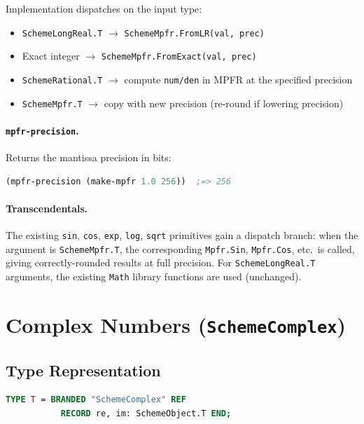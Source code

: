 \documentclass[12pt]{article}
\begin{document}
\noindent Implementation dispatches on the input type:
\begin{itemize}[nosep]
\item {\tt SchemeLongReal.T} $\to$ {\tt SchemeMpfr.FromLR(val, prec)}
\item Exact integer $\to$ {\tt SchemeMpfr.FromExact(val, prec)}
\item {\tt SchemeRational.T} $\to$ compute {\tt num/den} in MPFR
  at the specified precision
\item {\tt SchemeMpfr.T} $\to$ copy with new precision (re-round
  if lowering precision)
\end{itemize}

\paragraph{{\tt mpfr-precision}.}
Returns the mantissa precision in bits:
\begin{lstlisting}[language=Scheme]
(mpfr-precision (make-mpfr 1.0 256))  ;=> 256
\end{lstlisting}

\paragraph{Transcendentals.}
The existing {\tt sin}, {\tt cos}, {\tt exp}, {\tt log}, {\tt sqrt}
primitives gain a dispatch branch: when the argument is
{\tt SchemeMpfr.T}, the corresponding {\tt Mpfr.Sin}, {\tt Mpfr.Cos},
etc.\ is called, giving correctly-rounded results at full precision.
For {\tt SchemeLongReal.T} arguments, the existing {\tt Math}
library functions are used (unchanged).


\section{Complex Numbers ({\tt SchemeComplex})}
\label{sec:complex}

\subsection{Type Representation}

\begin{lstlisting}[language=Modula3]
TYPE T = BRANDED "SchemeComplex" REF
           RECORD re, im: SchemeObject.T END;
\end{lstlisting}
\end{document}
